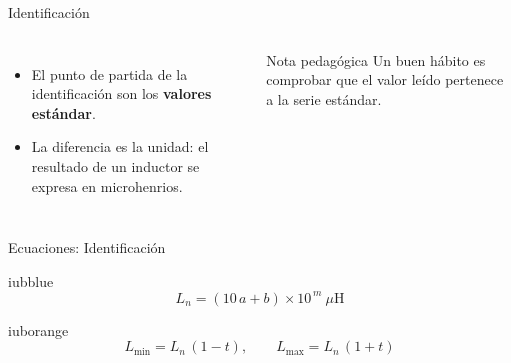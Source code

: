 \documentclass[aspectratio=169,11pt,xcolor={table}]{beamer}
\begin{document}
\begin{frame}{Identificación}
\begin{columns}[c,onlytextwidth]
\small
\begin{itemize}\setlength{\itemsep}{4pt}
  \item El punto de partida de la identificación son los \textbf{valores estándar}.
  \item La diferencia es la unidad: el resultado de un inductor se expresa en microhenrios.
\end{itemize}
\begin{cardO}{Nota pedagógica}
\footnotesize Un buen hábito es comprobar que el valor leído pertenece a la serie estándar.
\end{cardO}
\end{columns}
\end{frame}

\begin{frame}{Ecuaciones: Identificación}
\begin{cajaplana}{iubblue}
\centering
{\large
\begin{equation*}
  L_{n} = (10\,a + b) \times 10^{\,m}\ \mu\text{H}
\end{equation*}
}
\end{cajaplana}
\vspace{1mm}
\begin{cajaplana}{iuborange}
\centering
{\large
\begin{equation*}
  L_{\min} = L_{n}\,(1 - t), \qquad L_{\max} = L_{n}\,(1 + t)
\end{equation*}
}
\end{cajaplana}
\end{frame}
\end{document}
